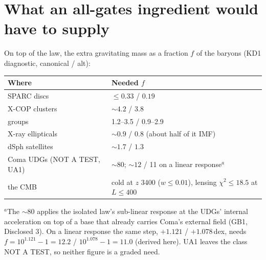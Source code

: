 \documentclass[10pt]{article}
\begin{document}
\section{What an all-gates ingredient would have to supply}
On top of the law, the extra gravitating mass as a fraction $f$ of the baryons (KD1 diagnostic, canonical / alt):
\begin{center}\small
\begin{tabular}{@{}ll@{}}\toprule
Where & Needed $f$\\\midrule
SPARC discs & $\le0.33$ / $0.19$\\
X-COP clusters & $\sim4.2$ / $3.8$\\
groups & 1.2--3.5 / 0.9--2.9\\
X-ray ellipticals & $\sim0.9$ / $0.8$ (about half of it IMF)\\
dSph satellites & $\sim1.7$ / $1.3$\\
Coma UDGs (NOT A TEST, UA1) & $\sim80$; $\sim12$ / 11 on a linear response$^{a}$\\
the CMB & cold at $z$ 3400 ($w\le0.01$), lensing $\chi^2\le18.5$ at $L\le400$\\\bottomrule
\end{tabular}\end{center}
{\footnotesize $^{a}$The $\sim80$ applies the isolated law's sub-linear response at the UDGs' internal acceleration on top of a base that already carries Coma's external field (GB1, Disclosed 3). On a linear response the same step, $+1.121$ / $+1.078$\,dex, needs $f=10^{1.121}-1=12.2$ / $10^{1.078}-1=11.0$ (derived here). UA1 leaves the class NOT A TEST, so neither figure is a graded need.\par}
\end{document}
